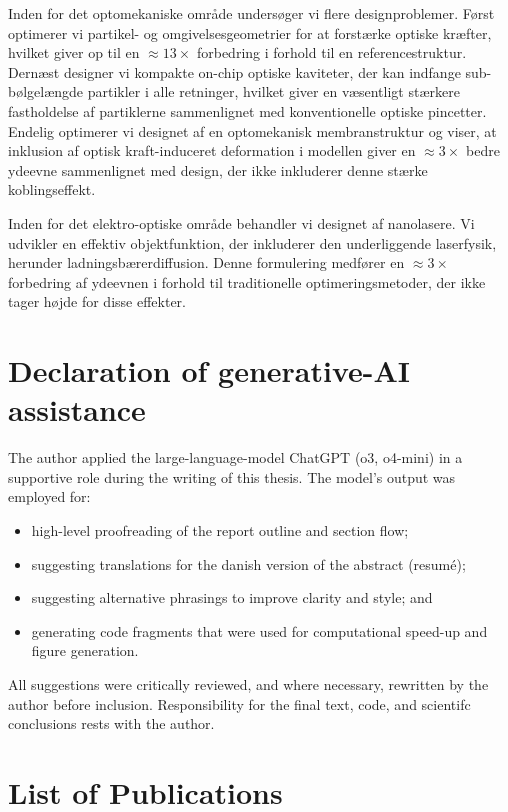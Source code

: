 Inden for det optomekaniske område undersøger vi flere designproblemer. Først optimerer vi partikel- og omgivelsesgeometrier for at forstærke optiske kræfter, hvilket giver op til en $\approx 13 \times$ forbedring i forhold til en referencestruktur. Dernæst designer vi kompakte on-chip optiske kaviteter, der kan indfange sub-bølgelængde partikler i alle retninger, hvilket giver en væsentligt stærkere fastholdelse af partiklerne sammenlignet med konventionelle optiske pincetter. Endelig optimerer vi designet af en optomekanisk membran\-struktur og viser, at inklusion af optisk kraft-induceret deformation i modellen giver en $\approx 3 \times$ bedre ydeevne sammenlignet med design, der ikke inkluderer denne stærke koblingseffekt.

Inden for det elektro-optiske område behandler vi designet af nanolasere. Vi udvikler en effektiv objektfunktion, der inkluderer den underliggende laser\-fy\-sik, herunder ladningsbærerdiffusion. Denne formulering medfører en \mbox{$\approx 3 \times$} forbe\-dring af ydeevnen i forhold til traditionelle optimeringsmetoder, der ikke tager højde for disse effekter.

\cleardoublepage
\chapter*{Declaration of generative-AI assistance}

The author applied the large-language-model ChatGPT (o3, o4-mini) in a supportive role
during the writing of this thesis. The model's output was employed for:
\begin{itemize}
\item high-level proofreading of the report outline and section flow;
\item suggesting translations for the danish version of the abstract (resumé);
\item suggesting alternative phrasings to improve clarity and style; and
\item generating code fragments that were used for computational speed-up and figure generation.
\end{itemize}
All suggestions were critically reviewed, and where necessary, rewritten by the author before
inclusion. Responsibility for the final text, code, and scientifc conclusions rests with the author.

\cleardoublepage
\chapter*{List of Publications}
\nocite{ownpub0,ownpub1,ownpub3, ownpub2, ownpub4, ownpub5}
\newrefcontext[sorting=none,labelprefix=P]
\printbibliography[env=bibliographyNUM,keyword=myPub,title={List of publications},heading=none,resetnumbers]
\newrefcontext[sorting=none,labelprefix=M]
\printbibliography[env=bibliographyNUM,keyword=myMan,heading=none]

\cleardoublepage

{
  \hypersetup{linkcolor=black}
  \tableofcontents*
}


